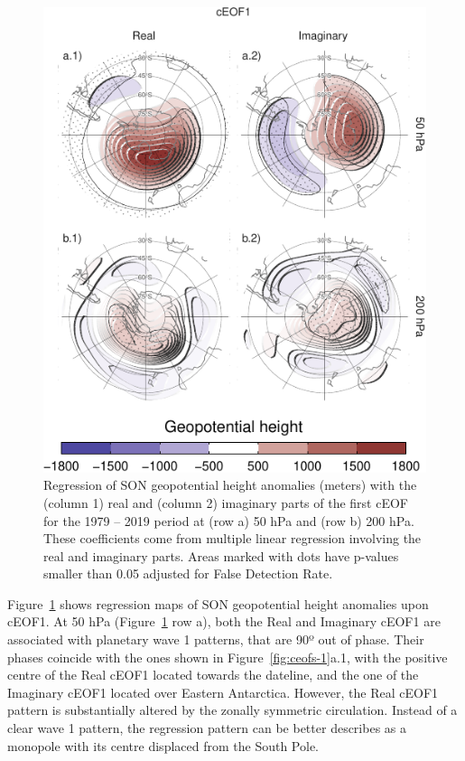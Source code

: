 \documentclass[smallextended]{svjour3}       %
\begin{document}
\begin{figure}
\centering
\includegraphics{../figures/eof1-regr-gh-1.pdf}
\caption{\label{fig:eof1-regr-gh}Regression of SON geopotential height anomalies (meters) with the (column 1) real and (column 2) imaginary parts of the first cEOF for the 1979 -- 2019 period at (row a) 50 hPa and (row b) 200 hPa. These coefficients come from multiple linear regression involving the real and imaginary parts. Areas marked with dots have p-values smaller than 0.05 adjusted for False Detection Rate.}
\end{figure}

Figure~\ref{fig:eof1-regr-gh} shows regression maps of SON geopotential height anomalies upon cEOF1.
At 50 hPa (Figure~\ref{fig:eof1-regr-gh} row a), both the Real and Imaginary cEOF1 are associated with planetary wave 1 patterns, that are 90º out of phase.
Their phases coincide with the ones shown in Figure~\ref{fig:ceofs-1}a.1, with the positive centre of the Real cEOF1 located towards the dateline, and the one of the Imaginary cEOF1 located over Eastern Antarctica.
However, the Real cEOF1 pattern is substantially altered by the zonally symmetric circulation.
Instead of a clear wave 1 pattern, the regression pattern can be better describes as a monopole with its centre displaced from the South Pole.
\end{document}
